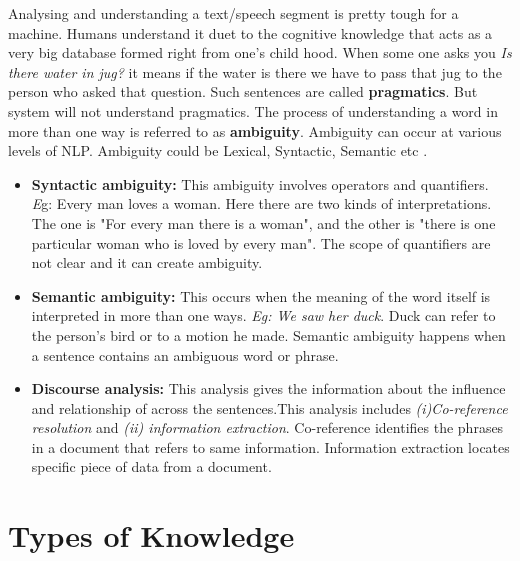 \documentclass{bmcart}
\begin{document}
	Analysing and understanding a text/speech segment is pretty tough for a machine. 
Humans understand it duet to the cognitive knowledge that acts as a very big database formed right from one's child hood. When some one asks you \textit{Is there water in jug?} it means if the water is there we have to pass that jug to the person who asked that question. Such sentences are called {\bf pragmatics}. But system will not understand pragmatics. The process of understanding a word in more than one way is referred to as \textbf{ambiguity}.  Ambiguity can occur at various levels of NLP. Ambiguity could be Lexical, Syntactic, Semantic etc \cite{ambiguity}. 

\begin{itemize}
\item {\bf Syntactic ambiguity:} This ambiguity involves operators and quantifiers. 
{\textit Eg: {Every man loves a woman}}. Here there are two kinds of interpretations. The one is "For every man there is a woman", and the other is "there is one particular woman who is loved by every man". The scope of quantifiers are not clear and it can create ambiguity.
\item {\bf Semantic ambiguity:} This occurs when the meaning of the word itself is interpreted in more than one ways.\textit{ Eg: We saw her duck}. Duck can refer to the
person’s bird or to a motion he made. Semantic ambiguity happens when a sentence contains an ambiguous word or phrase.
\item {\bf Discourse analysis:} This analysis gives the information about the influence and relationship of across the sentences.This analysis includes \textit{(i)Co-reference resolution} and \textit{(ii) information extraction}. Co-reference identifies the  phrases in a document that refers to same information. Information extraction locates specific piece of data from a document. 
\end{itemize}

\section{Types of Knowledge}
\label{sec:knowledgeTypes}
\end{document}
